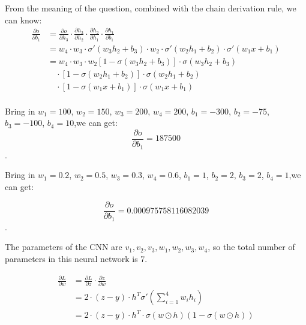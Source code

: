 \documentclass[oneside,solution]{seu-ml-assign}
\begin{document}
From the meaning of the question, combined with the chain derivation rule, we can know:
\begin{equation}
  \begin{aligned}
    \frac{\partial o}{\partial b_1} & = \frac{\partial o}{\partial h_3} \cdot \frac{\partial h_3}{\partial h_2} \cdot \frac{\partial h_2}{\partial h_1} \cdot \frac{\partial h_1}{\partial b_1} \\
                                    & = w_4 \cdot w_3 \cdot \sigma'(w_3 h_2 + b_3) \cdot w_2 \cdot \sigma'(w_2 h_1 + b_2) \cdot \sigma'(w_1 x + b_1)                                            \\
                                    & = w_4 \cdot w_3 \cdot w_2  [1 - \sigma(w_3 h_2 + b_3)] \cdot \sigma(w_3 h_2 + b_3)                                                                        \\
                                    & \quad \cdot [1 - \sigma(w_2 h_1 + b_2)] \cdot \sigma(w_2 h_1 + b_2)                                                                                       \\
                                    & \quad \cdot [1 - \sigma(w_1 x + b_1)] \cdot \sigma(w_1 x + b_1)                                                                                           \\
  \end{aligned}
\end{equation}


\subproblem{}
Bring in $w_1 = 100$, $w_2 = 150$, $w_3 = 200$, $w_4 = 200$, $b_1 = -300$, $b_2 = -75$, $b_3 = -100$, $b_4 = 10$,we can get:
\begin{equation}
  \frac{\partial o}{\partial b_1} = 187500
\end{equation}.

\subproblem{}
Bring in $w_1 = 0.2$, $w_2 = 0.5$, $w_3 = 0.3$, $w_4 = 0.6$, $b_1 = 1$, $b_2 = 2$, $b_3 = 2$, $b_4 = 1$,we can get:

\begin{equation}
  \frac{\partial o}{\partial b_1} = 0.000975758116082039
\end{equation}.




\subproblem{}
The parameters of the CNN are $v_1, v_2, v_3, w_1, w_2, w_3, w_4$, so the total number of parameters in this neural network is 7.

\subproblem{}
\begin{equation}\begin{aligned}\frac{\partial L}{\partial w} & =\frac{\partial L}{\partial z}\cdot
               \frac{\partial z}{\partial w}                                       \\&=2\cdot(z-y)\cdot h^{T}\sigma'(\sum_{i=1}^{4}w_{i}h_{i})\\&=2\cdot(z-y)\cdot
               h^{T}\cdot\sigma(w \odot h)(1-\sigma(w \odot h))\end{aligned}
\end{equation}
\end{document}

